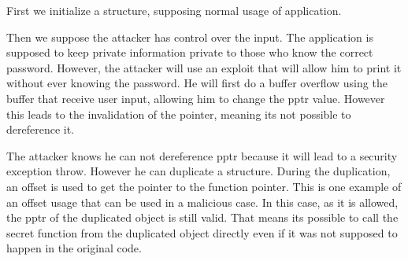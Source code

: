 \documentclass[a4paper, 11pt]{article}
\begin{document}
\def\boxheight{2}
\def\boxwidth{5}

\newcommand{\drawStruct}[4][]{

    \foreach \i [count=\j from 0] in {#4} {
        \draw[fill=green!10, #1] (#2, #3 - \j*\boxheight) rectangle 
        (#2 + \boxwidth, #3 - \j*\boxheight + \boxheight);
        \node at (#2 + \boxwidth/2, #3 - \j*\boxheight + 0.5*\boxheight) {\i};
    }
}
First we initialize a structure, supposing normal usage of application.
\begin{center}
\end{center}
Then we suppose the attacker has control over the input. The application is supposed to keep private information private to those who know the correct password. However, the attacker will use an exploit that will allow him to print it without ever knowing the password.
He will first do a buffer overflow using the buffer that receive user input, allowing him to change the pptr value. However this leads to the invalidation of the pointer, meaning its not possible to dereference it.
\begin{center}
\end{center}
The attacker knows he can not dereference pptr because it will lead to a security exception throw. However he can duplicate a structure.
During the duplication, an offset is used to get the pointer to the function pointer. This is one example of an offset usage that can be used in a malicious case. In this case, as it is allowed, the pptr of the duplicated object is still valid.
That means its possible to call the secret function from the duplicated object directly even if it was not supposed to happen in the original code.

\end{document}

